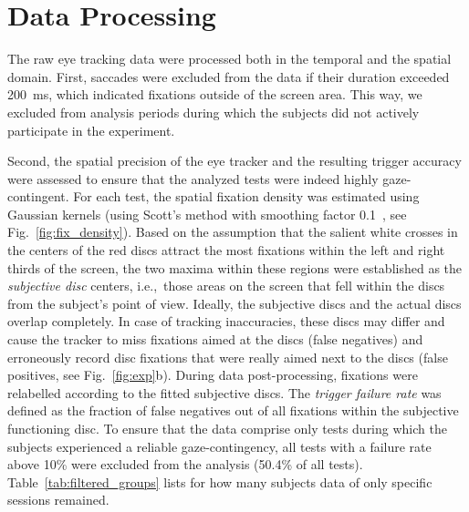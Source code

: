 \documentclass[a4paper]{scrreprt}
\begin{document}
\clearpage

\section{Data Processing}
\label{sec:met_processing}

The raw eye tracking data were processed both in the temporal and the spatial domain. First, saccades were excluded from the data if their duration exceeded 200~ms, which indicated fixations outside of the screen area. This way, we excluded from analysis periods during which the subjects did not actively participate in the experiment.

Second, the spatial precision of the eye tracker and the resulting trigger accuracy were assessed to ensure that the analyzed tests were indeed highly gaze-contingent. For each test, the spatial fixation density was estimated using Gaussian kernels (using Scott's method with smoothing factor 0.1~\cite{scott92}, see Fig.~\ref{fig:fix_density}). Based on the assumption that the salient white crosses in the centers of the red discs attract the most fixations within the left and right thirds of the screen, the two maxima within these regions were established as the \textit{subjective disc} centers, i.e.,~those areas on the screen that fell within the discs from the subject's point of view. Ideally, the subjective discs and the actual discs overlap completely. In case of tracking inaccuracies, these discs may differ and cause the tracker to miss fixations aimed at the discs (false negatives) and erroneously record disc fixations that were really aimed next to the discs (false positives, see Fig.~\ref{fig:exp}b). During data post-processing, fixations were relabelled according to the fitted subjective discs. The \textit{trigger failure rate} was defined as the fraction of false negatives out of all fixations within the subjective functioning disc. To ensure that the data comprise only tests during which the subjects experienced a reliable gaze-contingency, all tests with a failure rate above 10\% were excluded from the analysis (50.4\% of all tests). Table~\ref{tab:filtered_groups} lists for how many subjects data of only specific sessions remained.
\end{document}
